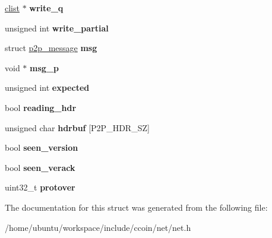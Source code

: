 \begin{DoxyCompactItemize}
\item 
\hypertarget{structnc__conn_af181044b7af6a2f59ff4c00b3300f275}{\hyperlink{structclist}{clist} $\ast$ {\bfseries write\-\_\-q}}\label{structnc__conn_af181044b7af6a2f59ff4c00b3300f275}

\item 
\hypertarget{structnc__conn_a2a3e5a6acbd8acba1af6d5a94a672c23}{unsigned int {\bfseries write\-\_\-partial}}\label{structnc__conn_a2a3e5a6acbd8acba1af6d5a94a672c23}

\item 
\hypertarget{structnc__conn_a8c5a0b6f156e751cb4c7e4501a47b7ba}{struct \hyperlink{structp2p__message}{p2p\-\_\-message} {\bfseries msg}}\label{structnc__conn_a8c5a0b6f156e751cb4c7e4501a47b7ba}

\item 
\hypertarget{structnc__conn_a6b845c88f7d63ca1d11cafed48dddd8a}{void $\ast$ {\bfseries msg\-\_\-p}}\label{structnc__conn_a6b845c88f7d63ca1d11cafed48dddd8a}

\item 
\hypertarget{structnc__conn_a814a7f5e8b493a1c58cb14c824b26404}{unsigned int {\bfseries expected}}\label{structnc__conn_a814a7f5e8b493a1c58cb14c824b26404}

\item 
\hypertarget{structnc__conn_aeabe10f6a4ca7221d3dda8be83335d93}{bool {\bfseries reading\-\_\-hdr}}\label{structnc__conn_aeabe10f6a4ca7221d3dda8be83335d93}

\item 
\hypertarget{structnc__conn_a73e8cc195f6ab0c907be85de7c13329b}{unsigned char {\bfseries hdrbuf} \mbox{[}P2\-P\-\_\-\-H\-D\-R\-\_\-\-S\-Z\mbox{]}}\label{structnc__conn_a73e8cc195f6ab0c907be85de7c13329b}

\item 
\hypertarget{structnc__conn_afce83e58195c68631feb560ad2b7f6ed}{bool {\bfseries seen\-\_\-version}}\label{structnc__conn_afce83e58195c68631feb560ad2b7f6ed}

\item 
\hypertarget{structnc__conn_a994eaa02bf18c48e433c3d4f38074a90}{bool {\bfseries seen\-\_\-verack}}\label{structnc__conn_a994eaa02bf18c48e433c3d4f38074a90}

\item 
\hypertarget{structnc__conn_a32808c425641ef09af9725f8acba11d8}{uint32\-\_\-t {\bfseries protover}}\label{structnc__conn_a32808c425641ef09af9725f8acba11d8}

\end{DoxyCompactItemize}


The documentation for this struct was generated from the following file\-:\begin{DoxyCompactItemize}
\item 
/home/ubuntu/workspace/include/ccoin/net/net.\-h\end{DoxyCompactItemize}
